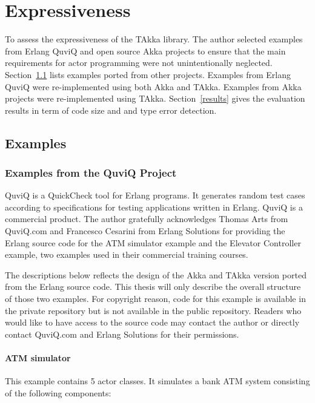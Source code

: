 \newpage 

\section{Expressiveness}
\label{expressiveness}

To assess the expressiveness of the TAkka library.  The author 
selected examples from Erlang QuviQ \citep{quviq}
and open source Akka projects to ensure that the main requirements for actor 
programming were not unintentionally neglected.  Section~\ref{examples}
lists examples ported from other projects. Examples from Erlang 
QuviQ were re-implemented using both Akka and TAkka.  Examples from 
Akka projects were re-implemented using TAkka.   Section~\ref{results}
gives the evaluation results in term of code size and and type error
detection.

\subsection{Examples}
\label{examples}

\subsubsection{Examples from the QuviQ Project}

QuviQ \citep{quviq} is a QuickCheck tool for Erlang programs.  It generates 
random test cases according to specifications for testing applications written 
in Erlang.  QuviQ is a commercial product.  The author gratefully acknowledges 
Thomas Arts from QuviQ.com and Francesco Cesarini from Erlang Solutions 
for providing the Erlang source code for the ATM simulator example and the 
Elevator Controller example, two examples used in their commercial training 
courses.

The descriptions below reflects the design of the Akka and TAkka version ported 
from the Erlang source code.  This thesis will only describe the overall 
structure of those two examples.  For copyright reason, code for this example
is available in the private repository but is not available in the 
public repository.  Readers who would like to have access to the source 
code may contact the author or directly contact QuviQ.com and Erlang Solutions for their permissions.







\paragraph{ATM simulator} This example contains 5 actor classes.  It simulates 
a bank ATM system consisting of the following components:

